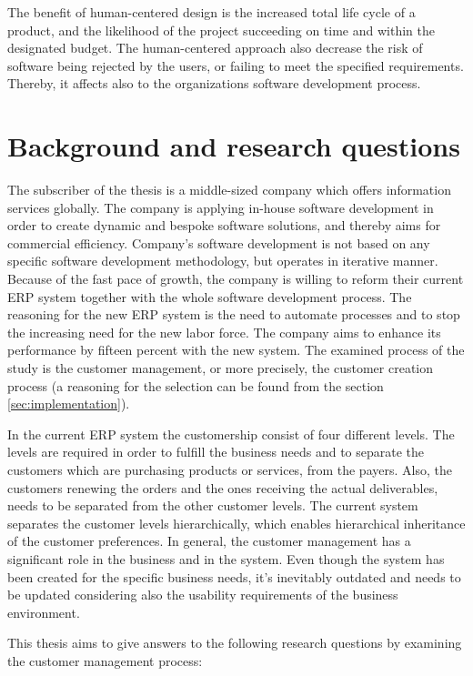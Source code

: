 \documentclass[12pt,a4paper,oneside,pdftex]{report}
\begin{document}
The benefit of human-centered design is the increased total life cycle of a product, and the likelihood of the project succeeding on time and within the designated budget. The human-centered approach also decrease the risk of software being rejected by the users, or failing to meet the specified requirements. \cite{RefWorks:16} Thereby, it affects also to the organizations software development process.

\section{Background and research questions}
\label{sec:background}
The subscriber of the thesis is a middle-sized company which offers information services globally. The company is applying in-house software development in order to create dynamic and bespoke software solutions, and thereby aims for commercial efficiency. Company's software development is not based on any specific software development methodology, but operates in iterative manner. Because of the fast pace of growth, the company is willing to reform their current ERP system together with the whole software development process. The reasoning for the new ERP system is the need to automate processes and to stop the increasing need for the new labor force. The company aims to enhance its performance by fifteen percent with the new system. The examined process of the study is the customer management, or more precisely, the customer creation process  (a reasoning for the selection can be found from the section \ref{sec:implementation}). 

In the current ERP system the customership consist of four different levels. The levels are required in order to fulfill the business needs and to separate the customers which are purchasing products or services, from the payers. Also, the customers renewing the orders and the ones receiving the actual deliverables, needs to be separated from the other customer levels. The current system separates the customer levels hierarchically, which enables hierarchical inheritance of the customer preferences. In general, the customer management has a significant role in the business and in the system. Even though the system has been created for the specific business needs, it's inevitably outdated and needs to be updated considering also the usability requirements of the business environment.

This thesis aims to give answers to the following research questions by examining the customer management process:
\end{document}
